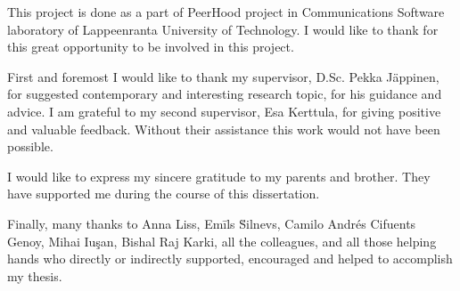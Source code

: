 %
%
This project is done as a part of \The PeerHood project in Communications Software laboratory of Lappeenranta University of Technology.
%
I would like to thank for this great opportunity to be involved in this project.

%
First and foremost I would like to thank my supervisor, D.Sc. Pekka J\"appinen, for suggested contemporary and interesting research topic, for his guidance and advice. 
%
I am grateful to my second supervisor, Esa Kerttula, for giving positive and valuable feedback. 
%
Without their assistance this work would not have been possible.

%
I would like to express my sincere gratitude to my parents and brother.
%
They have supported me during the course of this dissertation.

%
Finally, many thanks to Anna Liss, Em\={i}ls \u{S}i\cb l\cb nevs, Camilo Andr\'{e}s Cifuents Genoy, Mihai Iu\c{s}an, Bishal Raj Karki, all the colleagues, and all those helping hands who directly or indirectly supported, encouraged\T{,} and helped to accomplish my thesis.
